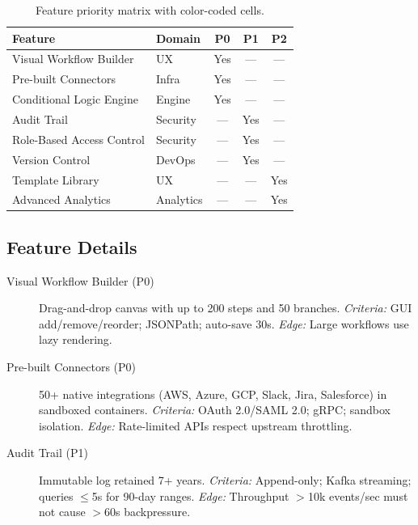 \documentclass[
    language=english,
    doctype=article,
    institution=none,
]{../../omnilatex}
\begin{document}
\begin{table}[htbp]
    \centering
    \begin{tabular}{@{}llccc@{}}
        \toprule
        \textbf{Feature} & \textbf{Domain} & \textbf{P0} & \textbf{P1}
            & \textbf{P2} \\
        \midrule
        Visual Workflow Builder    & UX       & \cellcolor{red!20}Yes
            & --- & --- \\
        Pre-built Connectors      & Infra    & \cellcolor{red!20}Yes
            & --- & --- \\
        Conditional Logic Engine   & Engine   & \cellcolor{red!20}Yes
            & --- & --- \\
        Audit Trail                & Security & --- & \cellcolor{yellow!30}Yes
            & --- \\
        Role-Based Access Control  & Security & --- & \cellcolor{yellow!30}Yes
            & --- \\
        Version Control            & DevOps   & --- & \cellcolor{yellow!30}Yes
            & --- \\
        Template Library           & UX       & --- & ---
            & \cellcolor{green!20}Yes \\
        Advanced Analytics         & Analytics & --- & ---
            & \cellcolor{green!20}Yes \\
        \bottomrule
    \end{tabular}
    \caption{Feature priority matrix with color-coded cells.}
    \label{tab:priority-matrix}
\end{table}

\subsection{Feature Details}

\begin{description}
    \item[Visual Workflow Builder (P0)] Drag-and-drop canvas with up to 200
        steps and 50 branches. \emph{Criteria:} GUI add/remove/reorder;
        JSONPath; auto-save 30s. \emph{Edge:} Large workflows use lazy
        rendering.
    \item[Pre-built Connectors (P0)] 50+ native integrations (AWS, Azure,
        GCP, Slack, Jira, Salesforce) in sandboxed containers.
        \emph{Criteria:} OAuth 2.0/SAML 2.0; gRPC; sandbox isolation.
        \emph{Edge:} Rate-limited APIs respect upstream throttling.
    \item[Audit Trail (P1)] Immutable log retained 7+ years.
        \emph{Criteria:} Append-only; Kafka streaming; queries $\leq$5s
        for 90-day ranges. \emph{Edge:} Throughput $>$10k events/sec
        must not cause $>$60s backpressure.
\end{description}
\end{document}

